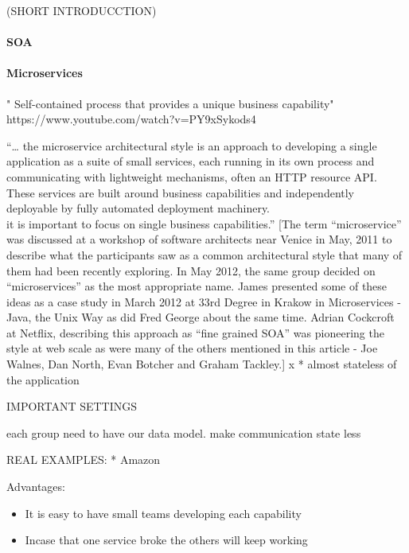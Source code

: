 \documentclass[]{article}
\providecommand{\tightlist}{%
  \setlength{\itemsep}{0pt}\setlength{\parskip}{0pt}}
\let\oldparagraph\paragraph
\renewcommand{\paragraph}[1]{\oldparagraph{#1}\mbox{}}
\begin{document}
(SHORT INTRODUCCTION)

\hypertarget{soa}{%
\paragraph{SOA}\label{soa}}

\hypertarget{microservices}{%
\paragraph{Microservices}\label{microservices}}

" Self-contained process that provides a unique business capability"
https://www.youtube.com/watch?v=PY9xSykods4

``\ldots{} the microservice architectural style is an approach to
developing a single application as a suite of small services, each
running in its own process and communicating with lightweight
mechanisms, often an HTTP resource API. These services are built around
business capabilities and independently deployable by fully automated
deployment machinery.\\
it is important to focus on single business capabilities.'' {[}The term
``microservice'' was discussed at a workshop of software architects near
Venice in May, 2011 to describe what the participants saw as a common
architectural style that many of them had been recently exploring. In
May 2012, the same group decided on ``microservices'' as the most
appropriate name. James presented some of these ideas as a case study in
March 2012 at 33rd Degree in Krakow in Microservices - Java, the Unix
Way as did Fred George about the same time. Adrian Cockcroft at Netflix,
describing this approach as ``fine grained SOA'' was pioneering the
style at web scale as were many of the others mentioned in this article
- Joe Walnes, Dan North, Evan Botcher and Graham Tackley.{]} x * almost
stateless of the application

IMPORTANT SETTINGS

each group need to have our data model. make communication state less

REAL EXAMPLES: * Amazon

Advantages:

\begin{itemize}
\tightlist
\item
  It is easy to have small teams developing each capability
\item
  Incase that one service broke the others will keep working
\end{itemize}
\end{document}
